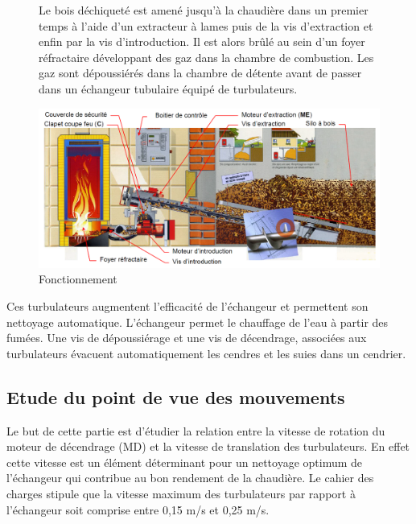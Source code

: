 \begin{figure}[htbp]
\begin{minipage}[c]{.35\linewidth}
Le bois déchiqueté est amené jusqu'à la chaudière dans un premier temps à l'aide d'un extracteur à lames puis de la vis d'extraction et enfin par la vis d'introduction. Il est alors brûlé au sein d'un foyer réfractaire développant des gaz dans la chambre de combustion. Les gaz sont dépoussiérés dans la chambre de détente avant de passer dans un échangeur tubulaire équipé de turbulateurs. 
\end{minipage}
\hfill
\begin{minipage}[c]{.6\linewidth}
\begin{center}
\includegraphics[width=\linewidth]{img/Fig2.png}
\caption{Fonctionnement}
\label{fig:image10}
\end{center}
\end{minipage}
\end{figure}

Ces turbulateurs augmentent l'efficacité de l'échangeur et permettent son nettoyage automatique. L'échangeur permet le chauffage de l'eau à partir des fumées. Une vis de dépoussiérage et une vis de décendrage, associées aux turbulateurs évacuent automatiquement les cendres et les suies dans un cendrier.

\subsection{Etude du point de vue des mouvements}

Le but de cette partie est d'étudier la relation entre la vitesse de rotation du moteur de décendrage (MD) et la vitesse de translation des turbulateurs. En effet cette vitesse est un élément déterminant pour un nettoyage optimum de l'échangeur qui contribue au bon rendement de la chaudière.
Le cahier des charges stipule que la vitesse maximum des turbulateurs par rapport à l'échangeur soit comprise entre 0,15 m/s et 0,25 m/s.

